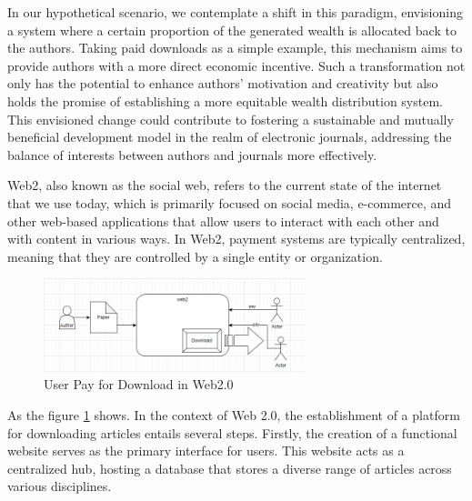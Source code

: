 \documentclass[lettersize,journal]{IEEEtran}
\begin{document}
In our hypothetical scenario, we contemplate a shift in this paradigm, envisioning a system where a certain proportion of the generated wealth is allocated back to the authors. Taking paid downloads as a simple example, this mechanism aims to provide authors with a more direct economic incentive. Such a transformation not only has the potential to enhance authors' motivation and creativity but also holds the promise of establishing a more equitable wealth distribution system. This envisioned change could contribute to fostering a sustainable and mutually beneficial development model in the realm of electronic journals, addressing the balance of interests between authors and journals more effectively.


Web2, also known as the social web, refers to the current state of the internet that we use today, which is primarily focused on social media, e-commerce, and other web-based applications that allow users to interact with each other and with content in various ways. In Web2, payment systems are typically centralized, meaning that they are controlled by a single entity or organization. 

\begin{figure}[h]
  \includegraphics[width=3in]{assets/web2.png}
  \caption{User Pay for Download in Web2.0}
  \label{fig:web2}
\end{figure}

As the figure \ref{fig:web2} shows. In the context of Web 2.0, the establishment of a platform for downloading articles entails several steps. Firstly, the creation of a functional website serves as the primary interface for users. This website acts as a centralized hub, hosting a database that stores a diverse range of articles across various disciplines.
\end{document}

